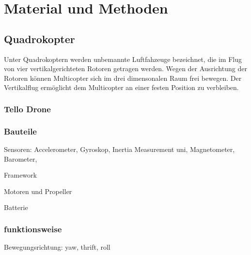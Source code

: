 \chapter{Material und Methoden}

\section{Quadrokopter}
Unter Quadrokoptern werden unbemannte Luftfahzeuge bezeichnet, die im Flug von vier vertikalgerichteten Rotoren getragen werden. Wegen der Ausrichtung der Rotoren können Multicopter sich im drei dimensonalen Raum frei bewegen. Der Vertikalflug ermöglicht dem Multicopter an einer festen Position zu verbleiben.

\subsection{Tello Drone}

\subsection{Bauteile}

Sensoren: Accelerometer, Gyroskop, Inertia Measurement uni, Magnetometer, Barometer,

Framework

Motoren und Propeller

Batterie

\subsection{funktionsweise}

Bewegungsrichtung: yaw, thrift, roll
